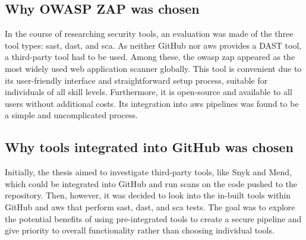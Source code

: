 \subsection{Why OWASP ZAP was chosen}
In the course of researching security tools, an evaluation was made of the three tool types: \acrshort{sast},  \acrshort{dast}, and \acrshort{sca}. As neither GitHub nor \acrshort{aws} provides a DAST tool, a third-party tool had to be used. Among these, the \acrshort{owasp} \acrshort{zap} appeared as the most widely used web application scanner globally. This tool is convenient due to its user-friendly interface and straightforward setup process, suitable for individuals of all skill levels. Furthermore, it is open-source and available to all users without additional costs. Its integration into \acrshort{aws} pipelines was found to be a simple and uncomplicated process.

\subsection{Why tools integrated into GitHub was chosen}
Initially, the thesis aimed to investigate third-party tools, like Snyk and Mend, which could be integrated into GitHub and run scans on the code pushed to the repository. Then, however, it was decided to look into the in-built tools within GitHub and \acrshort{aws} that perform \acrshort{sast}, \acrshort{dast}, and \acrshort{sca} tests. The goal was to explore the potential benefits of using pre-integrated tools to create a secure pipeline and give priority to overall functionality rather than choosing individual tools.

